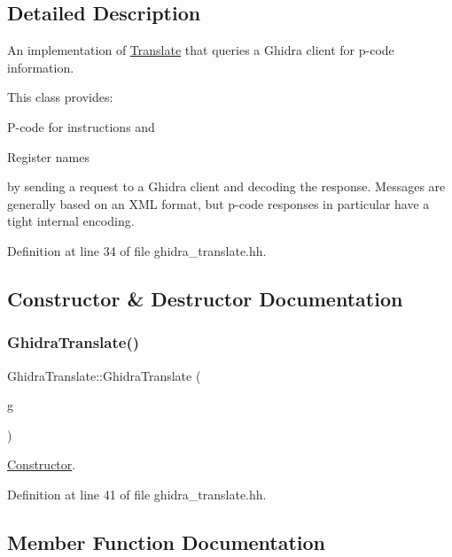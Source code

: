\subsection{Detailed Description}
An implementation of \mbox{\hyperlink{class_translate}{Translate}} that queries a Ghidra client for p-\/code information. 

This class provides\+:
\begin{DoxyItemize}
\item P-\/code for instructions and
\item Register names
\end{DoxyItemize}

by sending a request to a Ghidra client and decoding the response. Messages are generally based on an X\+ML format, but p-\/code responses in particular have a tight internal encoding. 

Definition at line 34 of file ghidra\+\_\+translate.\+hh.



\subsection{Constructor \& Destructor Documentation}
\mbox{\label{class_ghidra_translate_a2f61a23911f8dc1d08527b6ccf199a12}} 
\subsubsection{\texorpdfstring{GhidraTranslate()}{GhidraTranslate()}}
{\footnotesize\ttfamily Ghidra\+Translate\+::\+Ghidra\+Translate (\begin{DoxyParamCaption}\item[{\mbox{\hyperlink{class_architecture_ghidra}{Architecture\+Ghidra}} $\ast$}]{g }\end{DoxyParamCaption})\hspace{0.3cm}{\ttfamily [inline]}}



\mbox{\hyperlink{class_constructor}{Constructor}}. 



Definition at line 41 of file ghidra\+\_\+translate.\+hh.



\subsection{Member Function Documentation}
\mbox{\label{class_ghidra_translate_aa55013b7e45386ecf012cae6378950fa}} 
